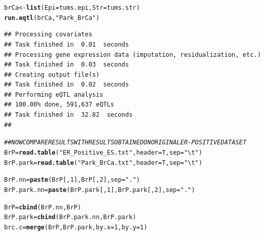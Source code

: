 \documentclass{article}\usepackage[]{graphicx}\usepackage[]{color}
\makeatletter
\newcommand{\hlnum}[1]{\textcolor[rgb]{0.686,0.059,0.569}{#1}}%
\newcommand{\hlstr}[1]{\textcolor[rgb]{0.192,0.494,0.8}{#1}}%
\newcommand{\hlcom}[1]{\textcolor[rgb]{0.678,0.584,0.686}{\textit{#1}}}%
\newcommand{\hlstd}[1]{\textcolor[rgb]{0.345,0.345,0.345}{#1}}%
\newcommand{\hlkwb}[1]{\textcolor[rgb]{0.69,0.353,0.396}{#1}}%
\newcommand{\hlkwc}[1]{\textcolor[rgb]{0.333,0.667,0.333}{#1}}%
\newcommand{\hlkwd}[1]{\textcolor[rgb]{0.737,0.353,0.396}{\textbf{#1}}}%
\newenvironment{kframe}{%
 \def\at@end@of@kframe{}%
 \ifinner\ifhmode%
  \def\at@end@of@kframe{\end{minipage}}%
  \begin{minipage}{\columnwidth}%
 \fi\fi%
 \def\FrameCommand##1{\hskip\@totalleftmargin \hskip-\fboxsep
 \colorbox{shadecolor}{##1}\hskip-\fboxsep
     \hskip-\linewidth \hskip-\@totalleftmargin \hskip\columnwidth}%
 \MakeFramed {\advance\hsize-\width
   \@totalleftmargin\z@ \linewidth\hsize
   \@setminipage}}%
 {\par\unskip\endMakeFramed%
 \at@end@of@kframe}
\newenvironment{knitrout}{}{} %
\makeatother
\begin{document}
\begin{knitrout}
\begin{kframe}
\begin{alltt}
\hlstd{brCa} \hlkwb{<-} \hlkwd{list}\hlstd{(}\hlkwc{Epi}\hlstd{=tums.epi,}\hlkwc{Str}\hlstd{=tums.str)}
\hlkwd{run.eqtl}\hlstd{(brCa,}\hlstr{"Park_BrCa"}\hlstd{)}
\end{alltt}
\begin{verbatim}
## Processing covariates 
## Task finished in  0.01  seconds
## Processing gene expression data (imputation, residualization, etc.) 
## Task finished in  0.03  seconds
## Creating output file(s) 
## Task finished in  0.02  seconds
## Performing eQTL analysis 
## 100.00% done, 591,637 eQTLs
## Task finished in  32.82  seconds
## 
\end{verbatim}
\begin{alltt}
\hlcom{## NOW COMPARE RESULTS WITH RESULTS OBTAINED ON ORIGINAL ER-POSITIVE DATASET}
\hlstd{BrP}\hlkwb{=}\hlkwd{read.table}\hlstd{(}\hlstr{"ER_Positive_ES.txt"}\hlstd{,}\hlkwc{header}\hlstd{=T,}\hlkwc{sep}\hlstd{=}\hlstr{"\textbackslash{}t"}\hlstd{)}
\hlstd{BrP.park}\hlkwb{=}\hlkwd{read.table}\hlstd{(}\hlstr{"Park_BrCa.txt"}\hlstd{,}\hlkwc{header}\hlstd{=T,}\hlkwc{sep}\hlstd{=}\hlstr{"\textbackslash{}t"}\hlstd{)}

\hlstd{BrP.nn}\hlkwb{=}\hlkwd{paste}\hlstd{(BrP[,}\hlnum{1}\hlstd{],BrP[,}\hlnum{2}\hlstd{],}\hlkwc{sep}\hlstd{=}\hlstr{"."}\hlstd{)}
\hlstd{BrP.park.nn}\hlkwb{=}\hlkwd{paste}\hlstd{(BrP.park[,}\hlnum{1}\hlstd{],BrP.park[,}\hlnum{2}\hlstd{],}\hlkwc{sep}\hlstd{=}\hlstr{"."}\hlstd{)}

\hlstd{BrP}\hlkwb{=}\hlkwd{cbind}\hlstd{(BrP.nn,BrP)}
\hlstd{BrP.park}\hlkwb{=}\hlkwd{cbind}\hlstd{(BrP.park.nn,BrP.park)}
\hlstd{brc.c}\hlkwb{=}\hlkwd{merge}\hlstd{(BrP,BrP.park,}\hlkwc{by.x}\hlstd{=}\hlnum{1}\hlstd{,}\hlkwc{by.y}\hlstd{=}\hlnum{1}\hlstd{)}


\end{alltt}
\end{kframe}
\end{knitrout}
\end{document}
